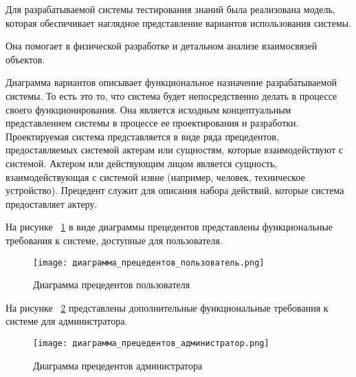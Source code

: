 Для разрабатываемой системы тестирования знаний была реализована модель, которая обеспечивает наглядное представление вариантов использования системы.

Она помогает в физической разработке и детальном анализе взаимосвязей объектов.

Диаграмма вариантов описывает функциональное назначение разрабатываемой системы. То есть это то, что система будет непосредственно делать в процессе своего функционирования. Она является исходным концептуальным представлением системы в процессе ее проектирования и разработки. Проектируемая система представляется в виде ряда прецедентов, предоставляемых системой актерам или сущностям, которые взаимодействуют с системой. Актером или действующим лицом является сущность, взаимодействующая с системой извне (например, человек, техническое устройство). Прецедент служит для описания набора действий, которые система предоставляет актеру.

\clearpage

На рисунке ~\ref{user_precedent_diagram:image} в виде диаграммы прецедентов представлены функциональные требования к системе, доступные для пользователя.

\begin{figure}[H]
	\texttt{[image: диаграмма\_прецедентов\_пользователь.png]}
	\caption{Диаграмма прецедентов пользователя}
	\label{user_precedent_diagram:image}
\end{figure}

\clearpage

На рисунке ~\ref{admin_precedent_diagram:image} представлены дополнительные функциональные требования к системе для администратора.

\begin{figure}[H]
	\texttt{[image: диаграмма\_прецедентов\_администратор.png]}
	\caption{Диаграмма прецедентов администратора}
	\label{admin_precedent_diagram:image}
\end{figure}

